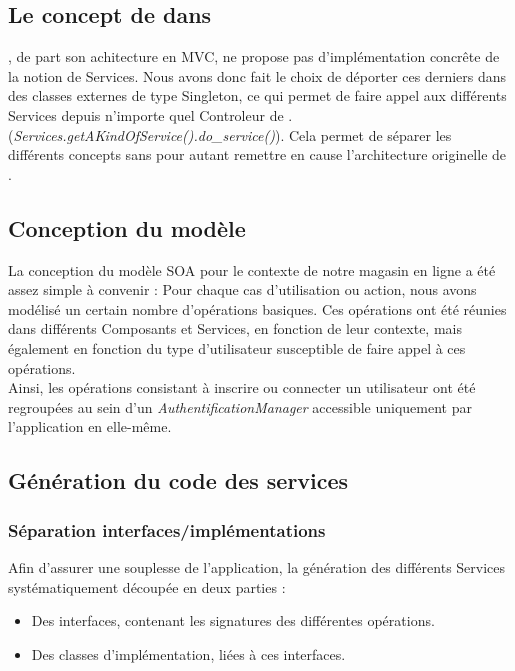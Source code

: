 \subsection{Le concept de \kwsoa{} dans \kwplay{}}

\kwplay{}, de part son achitecture en MVC, ne propose pas d'implémentation concrête de la notion de Services. 
Nous avons donc fait le choix de déporter ces derniers dans des classes externes de type Singleton, ce qui permet de faire appel aux différents Services depuis n'importe quel Controleur de \kwplay{}. (\textit{Services.getAKindOfService().do\_service()}). 
Cela permet de séparer les différents concepts sans pour autant remettre en cause l'architecture originelle de \kwplay{}.

\subsection{Conception du modèle}

La conception du modèle SOA pour le contexte de notre magasin en ligne a été assez simple à convenir : Pour chaque cas d'utilisation ou action, nous avons modélisé un certain nombre d'opérations basiques. Ces opérations ont été réunies dans différents Composants et Services, en fonction de leur contexte, mais également en fonction du type d'utilisateur susceptible de faire appel à ces opérations.\\
Ainsi, les opérations consistant à inscrire ou connecter un utilisateur ont été regroupées au sein d'un \textit{AuthentificationManager} accessible uniquement par l'application en elle-même. 

\subsection{Génération du code des services}

\subsubsection{Séparation interfaces/implémentations}

Afin d'assurer une souplesse de l'application, la génération des différents Services systématiquement découpée en deux parties :
\begin{itemize}
\item Des interfaces, contenant les signatures des différentes opérations.
\item Des classes d'implémentation, liées à ces interfaces.
\end{itemize}	

